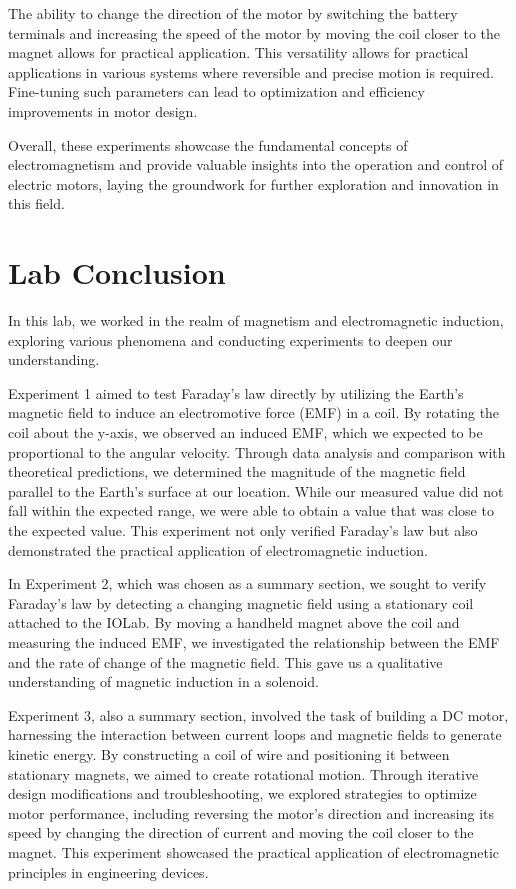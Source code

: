 \documentclass[11pt]{article}
\let\oldsection\section
\renewcommand\section{\clearpage\oldsection}
\begin{document}
    The ability to change the direction of the motor by switching the battery terminals and increasing the speed of the motor by moving the coil closer to the magnet allows for practical application. This versatility allows for practical applications in various systems where reversible and precise motion is required. Fine-tuning such parameters can lead to optimization and efficiency improvements in motor design.
    
    Overall, these experiments showcase the fundamental concepts of electromagnetism and provide valuable insights into the operation and control of electric motors, laying the groundwork for further exploration and innovation in this field.


    \section{Lab Conclusion}\label{sec:lab_conclusion}
    In this lab, we worked in the realm of magnetism and electromagnetic induction, exploring various phenomena and conducting experiments to deepen our understanding. 

    Experiment 1 aimed to test Faraday’s law directly by utilizing the Earth’s magnetic field to induce an electromotive force (EMF) in a coil.
    By rotating the coil about the y-axis, we observed an induced EMF, which we expected to be proportional to the angular velocity.
    Through data analysis and comparison with theoretical predictions, we determined the magnitude of the magnetic field parallel to the Earth’s surface at our location.
    While our measured value did not fall within the expected range, we were able to obtain a value that was close to the expected value.
    This experiment not only verified Faraday’s law but also demonstrated the practical application of electromagnetic induction.

    In Experiment 2, which was chosen as a summary section, we sought to verify Faraday’s law by detecting a changing magnetic field using a stationary coil attached to the IOLab. By moving a handheld magnet above the coil and measuring the induced EMF, we investigated the relationship between the EMF and the rate of change of the magnetic field. This gave us a qualitative understanding of magnetic induction in a solenoid.

    Experiment 3, also a summary section, involved the task of building a DC motor, harnessing the interaction between current loops and magnetic fields to generate kinetic energy. By constructing a coil of wire and positioning it between stationary magnets, we aimed to create rotational motion. Through iterative design modifications and troubleshooting, we explored strategies to optimize motor performance, including reversing the motor’s direction and increasing its speed by changing the direction of current and moving the coil closer to the magnet. This experiment showcased the practical application of electromagnetic principles in engineering devices.
\end{document}
